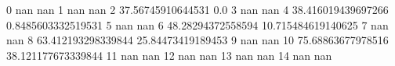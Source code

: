 0 nan nan
1 nan nan
2 37.56745910644531 0.0
3 nan nan
4 38.416019439697266 0.8485603332519531
5 nan nan
6 48.28294372558594 10.715484619140625
7 nan nan
8 63.412193298339844 25.84473419189453
9 nan nan
10 75.68863677978516 38.121177673339844
11 nan nan
12 nan nan
13 nan nan
14 nan nan
